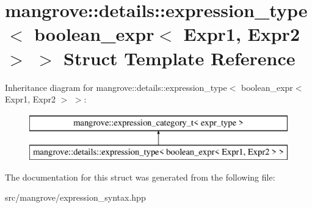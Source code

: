 \hypertarget{structmangrove_1_1details_1_1expression__type_3_01boolean__expr_3_01Expr1_00_01Expr2_01_4_01_4}{}\section{mangrove\+:\+:details\+:\+:expression\+\_\+type$<$ boolean\+\_\+expr$<$ Expr1, Expr2 $>$ $>$ Struct Template Reference}
\label{structmangrove_1_1details_1_1expression__type_3_01boolean__expr_3_01Expr1_00_01Expr2_01_4_01_4}
Inheritance diagram for mangrove\+:\+:details\+:\+:expression\+\_\+type$<$ boolean\+\_\+expr$<$ Expr1, Expr2 $>$ $>$\+:\begin{figure}[H]
\begin{center}
\leavevmode
\includegraphics[height=2.000000cm]{structmangrove_1_1details_1_1expression__type_3_01boolean__expr_3_01Expr1_00_01Expr2_01_4_01_4}
\end{center}
\end{figure}


The documentation for this struct was generated from the following file\+:\begin{DoxyCompactItemize}
\item 
src/mangrove/expression\+\_\+syntax.\+hpp\end{DoxyCompactItemize}

